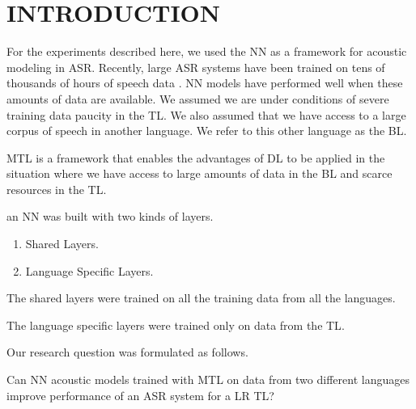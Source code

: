\section{INTRODUCTION}
\label{sec-2}

For the experiments described here, we used the \gls{NN} as a framework for acoustic modeling in \gls{ASR}. 
Recently, large \gls{ASR} systems have been trained on tens of thousands of hours of speech data \cite{Heigold13multilingualacoustic}. 
\gls{NN} models have performed well when these amounts of data are available. 
We assumed we are under conditions of severe training data paucity in the \gls{TL}.
We also assumed that we have access to a large corpus of speech in another language. 
We refer to this other language as the \gls{BL}.

\gls{MTL}\cite{Caruana93multitasklearning:} is a framework that enables the advantages of \gls{DL} to be applied in the situation where we have access to large amounts of data in the \gls{BL} and scarce   resources in the \gls{TL}.  

an \gls{NN} was built with two kinds of layers.
\begin{enumerate}
\item Shared Layers.
\item Language Specific Layers.
\end{enumerate}

The shared layers were trained on all the training data from all the languages.

The language specific layers were trained only on data from the \gls{TL}.

Our research question was formulated as follows.

Can \gls{NN} acoustic models trained with \gls{MTL} on data  from  two different languages improve performance of an  \gls{ASR} system for a \gls{LR} \gls{TL}?
